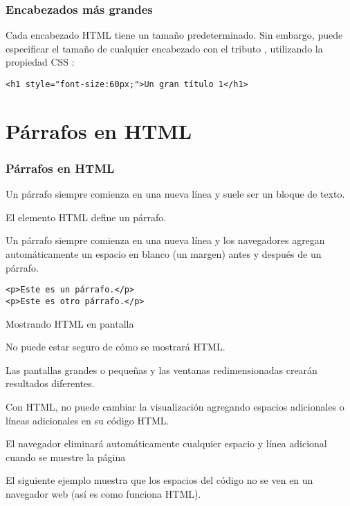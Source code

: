 \begin{frame}[fragile]
  \frametitle{Encabezados más grandes}

  Cada encabezado HTML tiene un tamaño predeterminado.
  Sin embargo, puede especificar el tamaño de cualquier encabezado
  con el tributo , utilizando la propiedad CSS :

  \vspace{\baselineskip}
  \begin{lstlisting}
<h1 style="font-size:60px;">Un gran título 1</h1>
  \end{lstlisting}
\end{frame}

\section{Párrafos en HTML}

\begin{frame}[fragile]
  \frametitle{Párrafos en HTML}

  Un párrafo siempre comienza en una nueva línea y suele ser un
  bloque de texto.

  \vspace{\baselineskip}
  El elemento HTML  define un párrafo.

  \vspace{\baselineskip}
  Un párrafo siempre comienza en una nueva línea y los navegadores
  agregan automáticamente un espacio en blanco (un margen) antes
  y después de un párrafo.

  \vspace{\baselineskip}
  \begin{lstlisting}
<p>Este es un párrafo.</p>
<p>Este es otro párrafo.</p>
  \end{lstlisting}
\end{frame}

\begin{frame}[c]{Mostrando HTML en pantalla}

  No puede estar seguro de cómo se mostrará HTML.

  \vspace{\baselineskip}
  Las pantallas grandes o pequeñas y las ventanas redimensionadas
  crearán resultados diferentes.

  \vspace{\baselineskip}
  Con HTML, no puede cambiar la visualización agregando espacios
  adicionales o líneas adicionales en su código HTML.

  \vspace{\baselineskip}
  El navegador eliminará automáticamente cualquier espacio y
  línea adicional cuando se muestre la página

  \vspace{\baselineskip}
  El siguiente ejemplo muestra que los espacios del código no se ven en un
  navegador web (así es como funciona HTML).
\end{frame}

